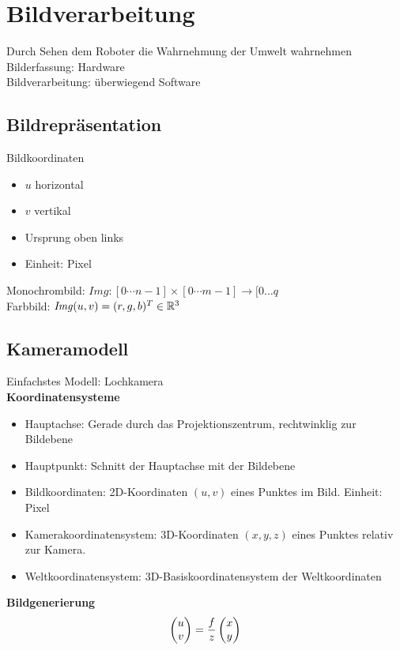 

\section{Bildverarbeitung}
Durch Sehen dem Roboter die Wahrnehmung der Umwelt wahrnehmen\\
Bilderfassung: Hardware\\
Bildverarbeitung: überwiegend Software\\

\subsection{Bildrepräsentation}
Bildkoordinaten
\begin{itemize}
\item \(u\) horizontal
\item \(v\) vertikal
\item Ursprung oben links
\item Einheit: Pixel
\end{itemize}

Monochrombild: \(\mathit{Img}: [0 \cdots n - 1] \times [0 \cdots m-1] \rightarrow [0\dots q\)\\
Farbbild: \(\mathit{Img}(u,v) = (r,g,b)^T \in \mathbb{R}^3\)

\subsection{Kameramodell}
Einfachstes Modell: Lochkamera\\
\textbf{Koordinatensysteme}\\
\begin{itemize}
\item Hauptachse: Gerade durch das Projektionszentrum, rechtwinklig zur Bildebene
\item Hauptpunkt: Schnitt der Hauptachse mit der Bildebene
\item Bildkoordinaten: 2D-Koordinaten \((u, v)\) eines Punktes im Bild. Einheit: Pixel
\item Kamerakoordinatensystem: 3D-Koordinaten \((x, y, z)\) eines Punktes relativ zur Kamera.
\item Weltkoordinatensystem: 3D-Basiskoordinatensystem der Weltkoordinaten
\end{itemize}

\textbf{Bildgenerierung}\\
\[\begin{pmatrix}u \\ v\end{pmatrix} = \frac{f}{z}\begin{pmatrix}x \\ y\end{pmatrix}\]

